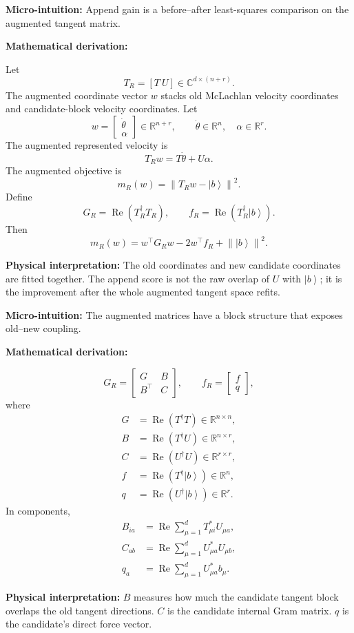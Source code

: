 \documentclass[10pt,twocolumn]{article}
\newcommand{\ket}[1]{\left|#1\right\rangle}
\newcommand{\norm}[1]{\left\lVert #1\right\rVert}
\newcommand{\R}{\mathbb R}
\newcommand{\C}{\mathbb C}
\newcommand{\Real}{\operatorname{Re}}
\newcommand{\micro}[1]{%
  \par\smallskip
  \noindent\textcolor{deepblue}{\textbf{Micro-intuition:}} #1
  \par\smallskip}
\newcommand{\deriv}{%
  \par\noindent\textcolor{deepviolet}{\textbf{Mathematical derivation:}}\par\vspace{-1mm}}
\newcommand{\phys}[1]{%
  \par\smallskip
  \noindent\textcolor{deepgreen}{\textbf{Physical interpretation:}} #1
  \par\smallskip}
\begin{document}
\micro{Append gain is a before--after least-squares comparison on the augmented
tangent matrix.}

\deriv
Let
\[
T_R=[T~U]\in\C^{d\times(n+r)}.
\]
The augmented coordinate vector \(w\) stacks old McLachlan velocity coordinates
and candidate-block velocity coordinates. Let
\[
w=
\begin{bmatrix}
\dot\theta\\
\alpha
\end{bmatrix}
\in\R^{n+r},
\qquad
\dot\theta\in\R^n,\quad \alpha\in\R^r.
\]
The augmented represented velocity is
\[
T_Rw=T\dot\theta+U\alpha.
\]
The augmented objective is
\[
m_R(w)=\norm{T_Rw-\ket b}^2.
\]
Define
\[
G_R=\Real(T_R^\dagger T_R),
\qquad
f_R=\Real(T_R^\dagger\ket b).
\]
Then
\[
m_R(w)=w^\top G_Rw-2w^\top f_R+\norm{\ket b}^2.
\]

\phys{The old coordinates and new candidate coordinates are fitted together.
The append score is not the raw overlap of \(U\) with \(\ket b\); it is the improvement
after the whole augmented tangent space refits.}

\micro{The augmented matrices have a block structure that exposes old--new
coupling.}

\deriv
\[
G_R
=
\begin{bmatrix}
G & B\\
B^\top & C
\end{bmatrix},
\qquad
f_R=
\begin{bmatrix}
f\\
q
\end{bmatrix},
\]
where
\[
\begin{aligned}
G&=\Real(T^\dagger T)\in\R^{n\times n},\\
B&=\Real(T^\dagger U)\in\R^{n\times r},\\
C&=\Real(U^\dagger U)\in\R^{r\times r},\\
f&=\Real(T^\dagger\ket b)\in\R^n,\\
q&=\Real(U^\dagger\ket b)\in\R^r.
\end{aligned}
\]
In components,
\[
\begin{aligned}
B_{ia}
&=\Real\sum_{\mu=1}^{d}T_{\mu i}^*U_{\mu a},\\
C_{ab}
&=\Real\sum_{\mu=1}^{d}U_{\mu a}^*U_{\mu b},\\
q_a
&=\Real\sum_{\mu=1}^{d}U_{\mu a}^*b_\mu.
\end{aligned}
\]

\phys{\(B\) measures how much the candidate tangent block overlaps the old
tangent directions. \(C\) is the candidate internal Gram matrix. \(q\) is the
candidate's direct force vector.}
\end{document}
